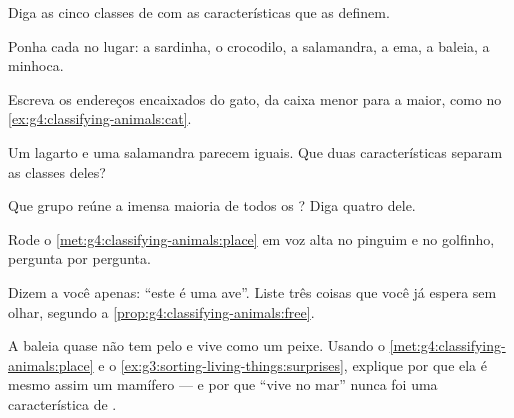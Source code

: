 \begin{exercise}[$\star$]\label{exo:g4:classifying-animals:2}
Diga as cinco classes de  com as características que as
definem.
\end{exercise}

\begin{exercise}[$\star$]\label{exo:g4:classifying-animals:3}
Ponha cada  no lugar: a sardinha, o crocodilo, a salamandra, a
ema, a baleia, a minhoca.
\end{exercise}

\begin{exercise}[$\star$]\label{exo:g4:classifying-animals:4}
Escreva os endereços encaixados do gato, da caixa menor para a
maior, como no \cref{ex:g4:classifying-animals:cat}.
\end{exercise}

\begin{exercise}[$\star$]\label{exo:g4:classifying-animals:5}
Um lagarto e uma salamandra parecem iguais. Que duas características
separam as classes deles?
\end{exercise}

\begin{exercise}[$\star$]\label{exo:g4:classifying-animals:6}
Que grupo reúne a imensa maioria de todos os ? Diga quatro
 dele.
\end{exercise}

\begin{exercise}[$\star$]\label{exo:g4:classifying-animals:7}
Rode o \cref{met:g4:classifying-animals:place} em voz alta no
pinguim e no golfinho, pergunta por pergunta.
\end{exercise}

\begin{exercise}[$\star$]\label{exo:g4:classifying-animals:8}
Dizem a você apenas: ``este  é uma ave''. Liste três coisas
que você já espera sem olhar, segundo a
\cref{prop:g4:classifying-animals:free}.
\end{exercise}

\begin{exercise}[$\star\star$]\label{exo:g4:classifying-animals:9}
A baleia quase não tem pelo e vive como um peixe. Usando o
\cref{met:g4:classifying-animals:place} e o
\cref{ex:g3:sorting-living-things:surprises}, explique por que ela é
mesmo assim um mamífero --- e por que ``vive no mar'' nunca foi uma
característica de .
\end{exercise}

